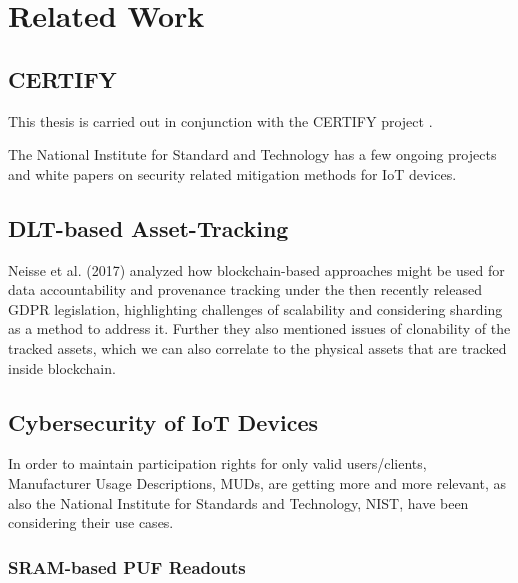 \chapter{Related Work}


\section{CERTIFY} %
\label{sec:CERTIFY}

This thesis is carried out in conjunction with the CERTIFY project \cite{certifyproject2023}.

The National Institute for Standard and Technology has a few ongoing projects and white papers on security related
mitigation methods for IoT devices.



\section{DLT-based Asset-Tracking} %
\label{sec:DLT-based Asset-Tracking}

Neisse et al. (2017) analyzed how blockchain-based approaches might be used for data accountability and provenance
tracking under the then recently released GDPR legislation, highlighting challenges of scalability and considering
sharding as a method to address it. \cite{neisse2017blockchain} Further they also mentioned issues of clonability of
the tracked assets, which we can also correlate to the physical assets that are tracked inside blockchain.



\section{Cybersecurity of IoT Devices} %
\label{sec:Cybersecurity of IoT Devices}

In order to maintain participation rights for only valid users/clients, Manufacturer Usage Descriptions, MUDs, are
getting more and more relevant, as also the National Institute for Standards and Technology, NIST, have been considering
their use cases. \cite{dodson2021securing}


\subsection{SRAM-based PUF Readouts} %
\label{sub:SRAM-based PUF Readouts}

